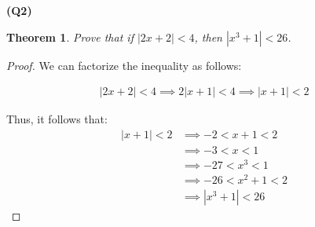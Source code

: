 \documentclass[12pt, a4paper]{article}
\newtheorem{theorem}{Theorem}
\begin{document}
\textbf{(Q2)}
\begin{theorem}
    Prove that if $|2x + 2| < 4$, then $|x^3 + 1| < 26$.
\end{theorem}

\begin{proof}
    We can factorize the inequality as follows:

    \begin{align*}
        |2x + 2| < 4 \implies 2|x + 1| < 4 \implies |x + 1| < 2
    \end{align*}
    
    Thus, it follows that:
    \begin{align*}
        |x + 1| < 2
        & \implies -2 < x + 1 < 2\\
        & \implies -3 < x  < 1\\
        & \implies -27 < x^3 < 1\\
        & \implies -26 < x^2 + 1 < 2\\
        & \implies |x^3 + 1| < 26
    \end{align*}
\end{proof}
\end{document}
